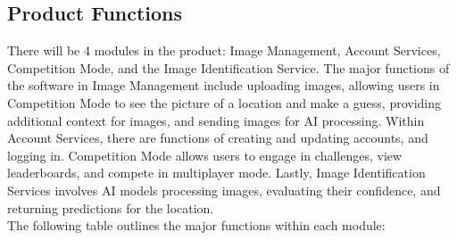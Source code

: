 \documentclass[]{article}
\begin{document}
\subsection{Product Functions}
\label{sub:product_functions}

\noindent There will be 4 modules in the product: Image Management, Account Services, Competition Mode, and the Image Identification Service. The major functions of the software in Image  Management include uploading images, allowing users in Competition Mode to see the picture of a location and make a guess, providing additional context for images, and sending images for AI processing. Within Account Services, there are functions of creating and updating accounts, and logging in. Competition Mode allows users to engage in challenges, view leaderboards, and compete in multiplayer mode. Lastly, Image Identification Services involves AI models processing images, evaluating their confidence, and returning predictions for the location.\\

\noindent The following table outlines the major functions within each module:
\end{document}

